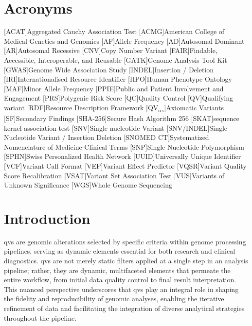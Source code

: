 \section*{Acronyms}
\renewenvironment{description}
{\list{}{\labelwidth0pt\itemindent-\leftmargin
    \parsep-1em\itemsep0pt\let\makelabel\descriptionlabel}}
               {\endlist}
\begin{acronym} 
 [ACAT]{Aggregated Cauchy Association Test }
 [ACMG]{American College of Medical Genetics and Genomics}
 [AF]{Allele Frequency}
 [AD]{Autosomal Dominant}
 [AR]{Autosomal Recessive}
  [CNV]{Copy Number Variant}
 [FAIR]{Findable, Accessible, Interoperable, and Reusable}
 [GATK]{Genome Analysis Tool Kit}
 [GWAS]{Genome Wide Association Study}
 [INDEL]{Insertion / Deletion}
 [IRI]{Internationalised Resource Identifier}
 [HPO]{Human Phenotype Ontology}
 [MAF]{Minor Allele Frequency}
 [PPIE]{Public and Patient Involvement and Engagement}
 [PRS]{Polygenic Risk Score} 
 [QC]{Quality Control}
 [QV]{Qualifying variant}
 [RDF]{Resource Description Framework}
 [QV\textsubscript{ax}]{Axiomatic Variants}
 [SF]{Secondary Findings}
 [SHA-256]{Secure Hash Algorithm 256}
 [SKAT]{sequence kernel association test} 
 [SNV]{Single nucleotide Variant}
  [SNV/INDEL]{Single Nucleotide Variant / Insertion Deletion}
  [SNOMED CT]{Systematized Nomenclature of Medicine-Clinical Terms}
 [SNP]{Single Nucleotide Polymorphism}
 [SPHN]{Swiss Personalized Health Network}
 [UUID]{Universally Unique Identifier}
 [VCF]{Variant Call Format}
  [VEP]{Variant Effect Predictor}
 [VQSR]{Variant Quality Score Recalibration}
 [VSAT]{Variant Set Association Test}
 [VUS]{Variants of Unknown Significance}
 [WGS]{Whole Genome Sequencing}
\end{acronym}

\clearpage

\section{Introduction}
\label{sec:intro}

\ac{qv}s are genomic alterations selected by specific criteria within genome processing pipelines, serving as dynamic elements essential for both research and clinical diagnostics. 
\ac{qv}s are not merely static filters applied at a single step in an analysis pipeline; rather, they are dynamic, multifaceted elements that permeate the entire workflow, from initial data quality control to final result interpretation. This nuanced perspective underscores that \ac{qv}s play an integral role in shaping the fidelity and reproducibility of genomic analyses, enabling the iterative refinement of data and facilitating the integration of diverse analytical strategies throughout the pipeline.

